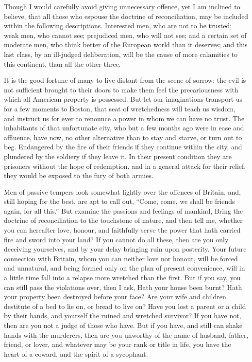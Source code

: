 \documentclass[12pt,oneside]{memoir}
\begin{document}
Though I would carefully avoid giving unnecessary offence, yet I am
inclined to believe, that all those who espouse the doctrine of
reconciliation, may be included within the following descriptions.
Interested men, who are not to be trusted; weak men, who cannot see;
prejudiced men, who will not see; and a certain set of moderate men,
who think better of the European world than it deserves; and this
last class, by an ill-judged deliberation, will be the cause of more
calamities to this continent, than all the other three.

It is the good fortune of many to live distant from the scene of
sorrow; the evil is not sufficient brought to their doors to make
them feel the precariousness with which all American property is
possessed. But let our imaginations transport us for a few moments
to Boston, that seat of wretchedness will teach us wisdom, and
instruct us for ever to renounce a power in whom we can have no
trust. The inhabitants of that unfortunate city, who but a few
months ago were in ease and affluence, have now, no other
alternative than to stay and starve, or turn out to beg. Endangered
by the fire of their friends if they continue within the city, and
plundered by the soldiery if they leave it. In their present
condition they are prisoners without the hope of redemption, and in
a general attack for their relief, they would be exposed to the fury
of both armies.

Men of passive tempers look somewhat lightly over the offences of
Britain, and, still hoping for the best, are apt to call out, ``Come,
come, we shall be friends again, for all this.'' But examine the
passions and feelings of mankind, Bring the doctrine of
reconciliation to the touchstone of nature, and then tell me,
whether you can hereafter love, honour, and faithfully serve the
power that hath carried fire and sword into your land? If you cannot
do all these, then are you only deceiving yourselves, and by your
delay bringing ruin upon posterity. Your future connection with
Britain, whom you can neither love nor honour, will be forced and
unnatural, and being formed only on the plan of present convenience,
will in a little time fall into a relapse more wretched than the
first. But if you say, you can still pass the violations over, then
I ask, Hath your house been burnt? Hath your property been destroyed
before your face? Are your wife and children destitute of a bed to
lie on, or bread to live on? Have you lost a parent or a child by
their hands, and yourself the ruined and wretched survivor? If you
have not, then are you not a judge of those who have. But if you
have, and still can shake hands with the murderers, then are you
unworthy of the name of husband, father, friend, or lover, and
whatever may be your rank or title in life, you have the heart of a
coward, and the spirit of a sycophant.
\end{document}
